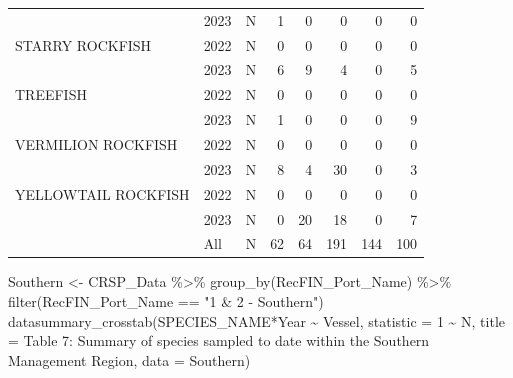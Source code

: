 \documentclass[
  letterpaper,
  DIV=11,
  numbers=noendperiod]{scrartcl}
\newenvironment{Shaded}{\begin{snugshade}}{\end{snugshade}}
\newcommand{\AttributeTok}[1]{\textcolor[rgb]{0.40,0.45,0.13}{#1}}
\newcommand{\DecValTok}[1]{\textcolor[rgb]{0.68,0.00,0.00}{#1}}
\newcommand{\FunctionTok}[1]{\textcolor[rgb]{0.28,0.35,0.67}{#1}}
\newcommand{\NormalTok}[1]{\textcolor[rgb]{0.00,0.23,0.31}{#1}}
\newcommand{\OtherTok}[1]{\textcolor[rgb]{0.00,0.23,0.31}{#1}}
\newcommand{\SpecialCharTok}[1]{\textcolor[rgb]{0.37,0.37,0.37}{#1}}
\newcommand{\StringTok}[1]{\textcolor[rgb]{0.13,0.47,0.30}{#1}}
\begin{document}
\begin{table}
\begin{tabular}[t]{lllrrrrr}
 & 2023 & N & 1 & 0 & 0 & 0 & 0\\
STARRY ROCKFISH & 2022 & N & 0 & 0 & 0 & 0 & 0\\
 & 2023 & N & 6 & 9 & 4 & 0 & 5\\
TREEFISH & 2022 & N & 0 & 0 & 0 & 0 & 0\\
 & 2023 & N & 1 & 0 & 0 & 0 & 9\\
VERMILION ROCKFISH & 2022 & N & 0 & 0 & 0 & 0 & 0\\
 & 2023 & N & 8 & 4 & 30 & 0 & 3\\
YELLOWTAIL ROCKFISH & 2022 & N & 0 & 0 & 0 & 0 & 0\\
 & 2023 & N & 0 & 20 & 18 & 0 & 7\\
 & All & N & 62 & 64 & 191 & 144 & 100\\
\bottomrule
\end{tabular}
\end{table}

\begin{Shaded}
\begin{Highlighting}[]
\NormalTok{Southern }\OtherTok{\textless{}{-}}\NormalTok{ CRSP\_Data }\SpecialCharTok{\%\textgreater{}\%}
  \FunctionTok{group\_by}\NormalTok{(RecFIN\_Port\_Name) }\SpecialCharTok{\%\textgreater{}\%}
  \FunctionTok{filter}\NormalTok{(RecFIN\_Port\_Name }\SpecialCharTok{==} \StringTok{"1 \& 2 {-} Southern"}\NormalTok{)}
\FunctionTok{datasummary\_crosstab}\NormalTok{(SPECIES\_NAME}\SpecialCharTok{*}\NormalTok{Year }\SpecialCharTok{\textasciitilde{}}\NormalTok{ Vessel, }\AttributeTok{statistic =} \DecValTok{1} \SpecialCharTok{\textasciitilde{}}\NormalTok{ N, }\AttributeTok{title =} \StringTok{\textquotesingle{}Table 7: Summary of species sampled to date within the Southern Management Region\textquotesingle{}}\NormalTok{, }\AttributeTok{data =}\NormalTok{ Southern)}
\end{Highlighting}
\end{Shaded}
\end{document}
